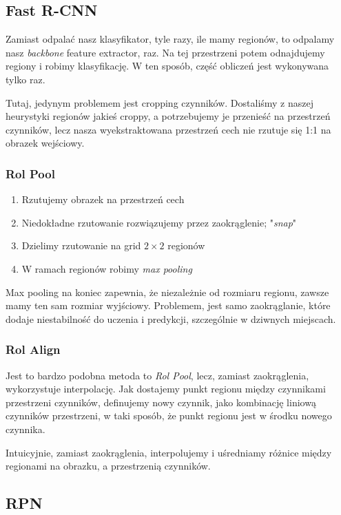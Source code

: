\documentclass{../notatki}
\begin{document}
\subsection{Fast R-CNN}

Zamiast odpalać nasz klasyfikator, tyle razy, ile mamy regionów, to odpalamy
nasz \textit{backbone} feature extractor, raz. Na tej przestrzeni potem
odnajdujemy regiony i robimy klasyfikację. W ten sposób, część
obliczeń jest wykonywana tylko raz.

Tutaj, jedynym problemem jest cropping czynników. Dostaliśmy z naszej
heurystyki regionów jakieś croppy, a potrzebujemy je przenieść na
przestrzeń czynników, lecz nasza wyekstraktowana
przestrzeń cech nie rzutuje się 1:1 na obrazek wejściowy.

\subsubsection{Rol Pool}

\begin{enumerate}
  \item Rzutujemy obrazek na przestrzeń cech
  \item Niedokładne rzutowanie rozwiązujemy przez zaokrąglenie; "\textit{snap}"
  \item Dzielimy rzutowanie na grid $2\times 2$ regionów
  \item W ramach regionów robimy \textit{max pooling}
\end{enumerate}

Max pooling na koniec zapewnia, że niezależnie od rozmiaru regionu, zawsze mamy
ten sam rozmiar wyjściowy. Problemem, jest samo zaokrąglanie, które dodaje
niestabilność do uczenia i predykcji, szczególnie w dziwnych miejscach.

\subsubsection{Rol Align}

Jest to bardzo podobna metoda to \textit{Rol Pool}, lecz, zamiast zaokrąglenia,
wykorzystuje interpolację. Jak dostajemy punkt regionu między czynnikami
przestrzeni czynników, definujemy nowy czynnik, jako kombinację
liniową czynników przestrzeni, w taki sposób, że punkt regionu jest w
środku nowego czynnika.

Intuicyjnie, zamiast zaokrąglenia, interpolujemy i uśredniamy różnice między
regionami na obrazku, a przestrzenią czynników.

\subsection{RPN}
\end{document}
